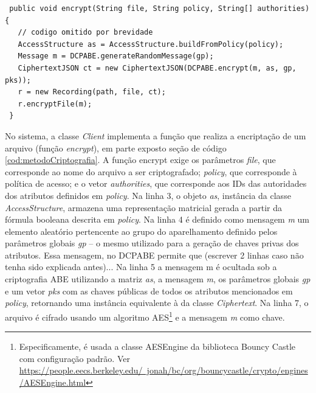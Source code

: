 \documentclass[a4paper,11pt]{article}
\begin{document}


\begin{lstlisting}
 public void encrypt(String file, String policy, String[] authorities) {
   // codigo omitido por brevidade
   AccessStructure as = AccessStructure.buildFromPolicy(policy);
   Message m = DCPABE.generateRandomMessage(gp);
   CiphertextJSON ct = new CiphertextJSON(DCPABE.encrypt(m, as, gp, pks));
   r = new Recording(path, file, ct);
   r.encryptFile(m);
 }
\end{lstlisting}

No sistema, a classe \emph{Client} implementa a função que realiza a encriptação de um arquivo (função \emph{encrypt}), em parte exposto seção de código \ref{cod:metodoCriptografia}. A função encrypt exige os parâmetros \emph{file}, que corresponde ao nome do arquivo a ser criptografado; \emph{policy}, que corresponde à política de acesso; e o vetor \emph{authorities}, que corresponde aos IDs das autoridades dos atributos definidos em \emph{policy}. Na linha 3, o objeto \emph{as}, instância da classe \emph{AccessStructure}, armazena uma representação matricial gerada a partir da fórmula booleana descrita em \emph{policy}. %
Na linha 4 é definido como mensagem \emph{m} um elemento aleatório pertencente ao grupo do aparelhamento definido pelos parâmetros globais \emph{gp} -- o mesmo utilizado para a geração de chaves privas dos atributos. {\color{magenta} Essa mensagem, no DCPABE permite que (escrever 2 linhas caso não tenha sido explicada antes)...} Na linha 5 a mensagem m é ocultada sob a criptografia ABE utilizando a matriz \emph{as}, a mensagem \emph{m}, os parâmetros globais \emph{gp} e um vetor \emph{pks} com as chaves públicas de todos os atributos mencionados em \emph{policy}, retornando uma instância equivalente à da classe \emph{Ciphertext}. %
Na linha 7, o arquivo é cifrado usando um algoritmo AES\footnote{Especificamente, é usada a classe AESEngine da biblioteca Bouncy Castle com configuração padrão. Ver \href{https://people.eecs.berkeley.edu/~jonah/bc/org/bouncycastle/crypto/engines/AESEngine.html}{https://people.eecs.berkeley.edu/~jonah/bc/org/bouncycastle/crypto/engines/AESEngine.html}} e a mensagem \emph{m} como chave.
\end{document}
